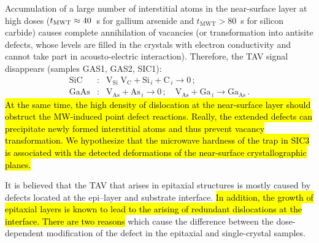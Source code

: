 \documentclass[10pt]{iopart}
\begin{document}
Accumulation of a large number of interstitial atoms in the near-surface layer at high doses
($t_{\rm MWT}\approx40$~s for gallium arsenide and $t_\mathrm{MWT}>80$~s for silicon carbide)
causes complete annihilation of vacancies (or transformation into antisite defects, whose levels are filled in the crystals with electron conductivity and cannot take part in acousto-electric interaction).
Therefore, the TAV signal disappears (samples GAS1, GAS2, SIC1):
\begin{eqnarray}
  \nonumber
  \mathrm{SiC}&:&\mathrm{V}_\mathrm{Si}\;\mathrm{V}_\mathrm{C}+\mathrm{Si}_{\,i}+ \mathrm{C}_{\,i} \rightarrow 0\,;\\
  \nonumber
  \mathrm{GaAs}&:&\mathrm{V}_\mathrm{As}+\mathrm{As}_{\,i} \rightarrow 0\,;\quad
  \mathrm{V}_\mathrm{As}+\mathrm{Ga}_{\,i} \rightarrow \mathrm{Ga}_\mathrm{As}\,.
\end{eqnarray}
\hl{At the same time, the high density of dislocation at the near-surface
layer should obstruct the MW-induced point defect reactions.
Really, the extended defects can precipitate newly formed interstitial atoms and thus prevent vacancy transformation.
We hypothesize that the microwave hardness of the trap in SIC3 is associated
with the detected deformations of the near-surface crystallographic planes.}


It is believed \cite{OstrovskiiSST,OlikhSSC,OstrovPAN} that the TAV
that arises in epitaxial structures
is mostly caused by defects located at the epi--layer and substrate interface.
\hl{In addition, the growth of epitaxial layers is known to lead to
the arising of redundant dislocations at the interface.
There are two reasons }which cause the difference between the dose-dependent modification
of the defect in the epitaxial and single-crystal samples. 
\end{document}
